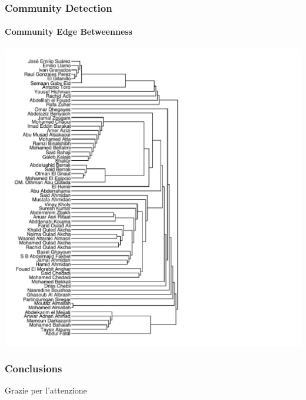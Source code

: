 \documentclass{beamer}
\begin{document}
\begin{frame}
\frametitle{Community Detection}
\framesubtitle{Community Edge Betweenness}
 \centering
\includegraphics[scale=0.35]{images/community_edge_betweenness.pdf}
\end{frame}

\begin{frame}
\frametitle{Conclusions}


\end{frame}

\begin{frame}
\Huge{\centerline{Grazie per l'attenzione}}
\end{frame}
\end{document}

